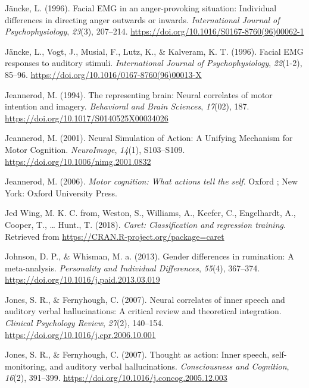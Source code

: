 \documentclass[a4paper,12pt,twoside,openright,oldfontcommands]{memoir}
\begin{document}
\leavevmode\hypertarget{ref-Jancke1996a}{}%
Jäncke, L. (1996). Facial EMG in an anger-provoking situation: Individual differences in directing anger outwards or inwards. \emph{International Journal of Psychophysiology}, \emph{23}(3), 207--214. \url{https://doi.org/10.1016/S0167-8760(96)00062-1}

\leavevmode\hypertarget{ref-Jancke1996}{}%
Jäncke, L., Vogt, J., Musial, F., Lutz, K., \& Kalveram, K. T. (1996). Facial EMG responses to auditory stimuli. \emph{International Journal of Psychophysiology}, \emph{22}(1-2), 85--96. \url{https://doi.org/10.1016/0167-8760(96)00013-X}

\leavevmode\hypertarget{ref-jeannerod_representing_1994}{}%
Jeannerod, M. (1994). The representing brain: Neural correlates of motor intention and imagery. \emph{Behavioral and Brain Sciences}, \emph{17}(02), 187. \url{https://doi.org/10.1017/S0140525X00034026}

\leavevmode\hypertarget{ref-jeannerod_neural_2001}{}%
Jeannerod, M. (2001). Neural Simulation of Action: A Unifying Mechanism for Motor Cognition. \emph{NeuroImage}, \emph{14}(1), S103--S109. \url{https://doi.org/10.1006/nimg.2001.0832}

\leavevmode\hypertarget{ref-jeannerod_motor_2006}{}%
Jeannerod, M. (2006). \emph{Motor cognition: What actions tell the self}. Oxford ; New York: Oxford University Press.

\leavevmode\hypertarget{ref-R-caret}{}%
Jed Wing, M. K. C. from, Weston, S., Williams, A., Keefer, C., Engelhardt, A., Cooper, T., \ldots{} Hunt., T. (2018). \emph{Caret: Classification and regression training}. Retrieved from \url{https://CRAN.R-project.org/package=caret}

\leavevmode\hypertarget{ref-Johnson2013}{}%
Johnson, D. P., \& Whisman, M. a. (2013). Gender differences in rumination: A meta-analysis. \emph{Personality and Individual Differences}, \emph{55}(4), 367--374. \url{https://doi.org/10.1016/j.paid.2013.03.019}

\leavevmode\hypertarget{ref-jones_neural_2007}{}%
Jones, S. R., \& Fernyhough, C. (2007). Neural correlates of inner speech and auditory verbal hallucinations: A critical review and theoretical integration. \emph{Clinical Psychology Review}, \emph{27}(2), 140--154. \url{https://doi.org/10.1016/j.cpr.2006.10.001}

\leavevmode\hypertarget{ref-Jones2007}{}%
Jones, S. R., \& Fernyhough, C. (2007). Thought as action: Inner speech, self-monitoring, and auditory verbal hallucinations. \emph{Consciousness and Cognition}, \emph{16}(2), 391--399. \url{https://doi.org/10.1016/j.concog.2005.12.003}
\end{document}
